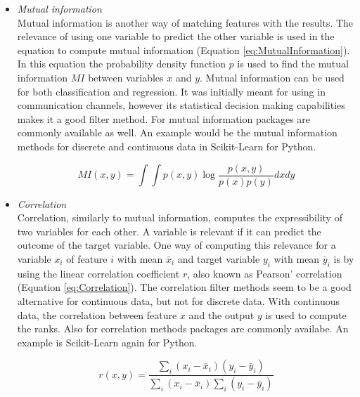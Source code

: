 \begin{itemize}
	\item \textit{Mutual information} \\
	Mutual information is another way of matching features with the results. The relevance of using one variable to predict the other variable is used in the equation to compute mutual information (Equation \ref{eq:MutualInformation}). In this equation the probability density function $p$ is used to find the mutual information $MI$ between variables $x$ and $y$\cite{peng2005feature}. Mutual information can be used for both classification and regression. It was initially meant for using in communication channels, however its statistical decision making capabilities makes it a good filter method\cite{battiti1994using}.
	For mutual information packages are commonly available as well. An example would be the mutual information methods for discrete and continuous data in Scikit-Learn\cite{pedregosa2011scikit} for Python.
	

	\begin{equation}\label{eq:MutualInformation}
	MI(x, y) = \int \int p(x, y) \log{\frac{p(x, y)}{p(x)p(y)}} dxdy
	\end{equation}
	
	\item \textit{Correlation} \\
	Correlation, similarly to mutual information, computes the expressibility of two variables for each other. A variable is relevant if it can predict the outcome of the target variable. One way of computing this relevance for a variable $x_i$ of feature $i$ with mean $\bar{x }_i$ and target variable $y_i$ with mean $\bar{y}_i$ is by using the linear correlation coefficient $r$, also known as Pearson' correlation\cite{yu2003feature} (Equation \ref{eq:Correlation}). The correlation filter methods seem to be a good alternative for continuous data, but not for discrete data. With continuous data, the correlation between feature $x$ and the output $y$ is used to compute the ranks\cite{hall2000correlation}.
	Also for correlation methods packages are commonly availabe. An example is Scikit-Learn\cite{pedregosa2011scikit} again for Python.
		
	\begin{equation}\label{eq:Correlation}
	r(x,y) = \frac{\sum_{i}(x_i - \bar{x}_i)(y_i -\bar{y}_i)}{\sum_{i}(x_i - \bar{x}_i)\sum_{i}(y_i -\bar{y}_i)}
	\end{equation}
	
	\end{itemize}
	

